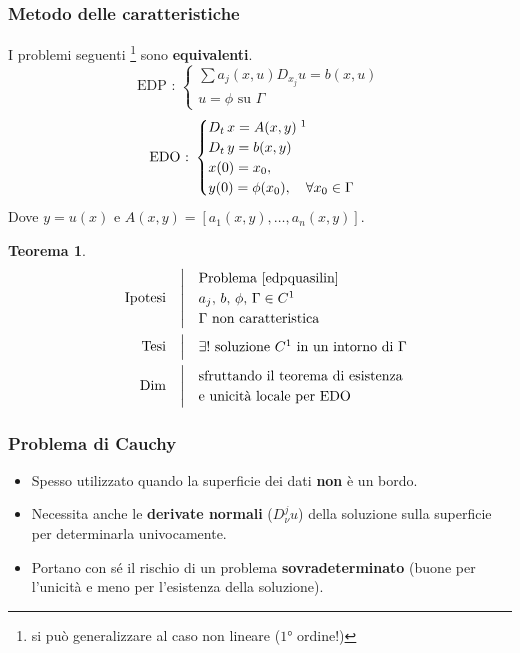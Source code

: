 \documentclass[serif,notheorems]{beamer}
\makeatletter
\newenvironment{ipotesi}%
{\quad\left|\quad\def\arraystretch{1.2}\begin{array}{@{}l@{}}}%
{\end{array}\right.}
\newcommand{\hpthdim}[3]
{
\begin{align*}
\quad
\text{Ipotesi}
&\begin{ipotesi} 
#1
\end{ipotesi}\\
\text{Tesi}
&\begin{ipotesi}
#2
\end{ipotesi}\\
\text{Dim}
&\begin{ipotesi}
#3
\end{ipotesi}
\end{align*}
}
\theoremstyle{definition} %
\newtheorem{theorem}{Teorema}[section] %
\theoremstyle{remark}
\makeatother
\begin{document}
\begin{frame}
\frametitle{Metodo delle caratteristiche}
I problemi seguenti \footnote{si può generalizzare al caso non lineare ($1$° ordine!)} sono \textbf{equivalenti}.
\begin{equation} \label{edpquasilin}
\text{EDP : }
\begin{cases}
\sum a_j(x,u)D_{x_j} u = b(x,u)\\
u = \phi \text{ su } \Gamma
\end{cases} 
\end{equation}
\begin{equation}
\text{EDO : }
\begin{cases}
D_t \, x = A(x,y) \; \footnotemark \\
D_t \, y = b(x,y)\\ 
x(0)=x_0,\\ 
y(0) = \phi (x_0), \quad \forall x_0 \in \Gamma
\end{cases} 
\end{equation}
Dove $y = u(x)$ e $A(x,y)=[a_1(x,y),\ldots ,a_n(x,y)]$.
\end{frame}

\begin{frame}
\begin{theorem}
\hpthdim{
\text{Problema \eqref{edpquasilin} } \\
a_j, \, b, \, \phi , \, \Gamma \in C^1\\
\Gamma \text{ non caratteristica}
}{
\exists ! \text{ soluzione } C^1 \text{ in un intorno di } \Gamma
}
{
\text{sfruttando il teorema di esistenza}\\ \text{e unicità locale per EDO}
}
\end{theorem}
\end{frame}

\begin{frame}
\frametitle{Problema di Cauchy}
\begin{itemize}
\item Spesso utilizzato quando la superficie dei dati \textbf{non} è un bordo.
\item Necessita anche le \textbf{derivate normali} ($D^j_\nu u$) della soluzione sulla superficie per determinarla univocamente.
\item Portano con sé il rischio di un problema \textbf{sovradeterminato} (buone per l'unicità e meno per l'esistenza della soluzione).
\end{itemize}
\end{frame}
\end{document}
